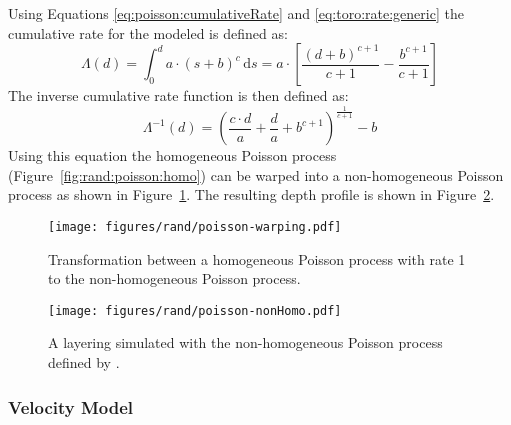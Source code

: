 \documentclass[12pt,oneside]{book}
\newcommand{\ud}{\,\mathrm{d}}
\begin{document}
Using Equations \ref{eq:poisson:cumulativeRate} and \ref{eq:toro:rate:generic} the cumulative rate
for the \citet{toro:95} modeled is defined as:
\begin{equation}
    \Lambda(d) = \int_{0}^{d} a \cdot (s + b)^{c} \ud s = a \cdot \left[\frac{(d+b)^{c+1}}{c+1} -\frac{b^{c+1}}{c+1} \right]
    \label{eq:toro:cumRate}
\end{equation}
The inverse cumulative rate function is then defined as:
\begin{equation}
    \Lambda^{-1}(d)=\left( \frac{c \cdot d}{a} + \frac{d}{a} + b^{c+1} \right)^\frac{1}{c+1} - b 
    \label{eq:toro:invCumRate}
\end{equation}
Using this equation the homogeneous Poisson process (Figure~\ref{fig:rand:poisson:homo}) can
be warped into a non-homogeneous Poisson process as shown in Figure~\ref{fig:rand:poisson:transform}.
The resulting depth profile is shown in Figure~\ref{fig:rand:poisson:nonHomo}.

\begin{figure}[p]
    \begin{center}
        \texttt{[image: figures/rand/poisson-warping.pdf]}
    \end{center}
    \caption{Transformation between a homogeneous Poisson process with rate 1 to the \citet{toro:95}
    non-homogeneous Poisson process.}
    \label{fig:rand:poisson:transform}
\end{figure}
\begin{figure}[p]
    \begin{center}
        \texttt{[image: figures/rand/poisson-nonHomo.pdf]}
    \end{center}
    \caption{A layering simulated with the non-homogeneous Poisson process defined by
    \citet{toro:95}.}
    \label{fig:rand:poisson:nonHomo}
\end{figure}

\subsubsection{Velocity Model}
\end{document}
